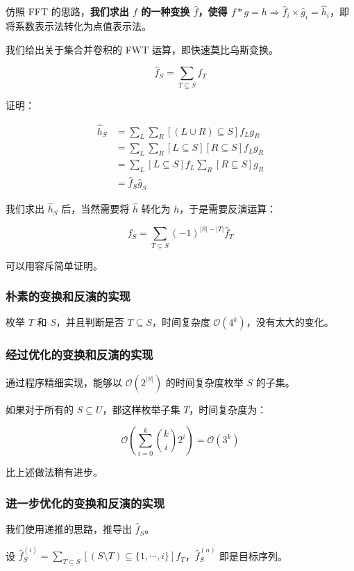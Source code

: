 \documentclass{article}
\begin{document}
仿照 FFT 的思路，\textbf{我们求出 $f$ 的一种变换 $\hat f$，使得 $f * g = h \Rightarrow \hat f_i \times \hat g_i = \hat h_i$}，即将系数表示法转化为点值表示法。

我们给出关于集合并卷积的 FWT 运算，即快速莫比乌斯变换。

$$\hat f_S=\sum_{T \subseteq S} f_T$$

证明：

$$
\begin{aligned}
	\hat h_S &=\sum_{L} \sum_{R} [(L \cup R) \subseteq S] f_L g_R \\
		 &= \sum_{L} \sum_{R} [L \subseteq S][R \subseteq S] f_L g_R \\
		 &= \sum_{L} [L \subseteq S] f_L \sum_{R} [R \subseteq S] g_R \\
		 &= \hat f_S \hat g_S
\end{aligned}
$$

我们求出 $\hat h_S$ 后，当然需要将 $\hat h$ 转化为 $h$，于是需要反演运算：

$$f_S=\sum_{T \subseteq S} (-1)^{|S|-|T|}\hat f_T$$

可以用容斥简单证明。

\subsubsection*{朴素的变换和反演的实现}

枚举 $T$ 和 $S$，并且判断是否 $T \subseteq S$，时间复杂度 $\mathcal O(4^k)$，没有太大的变化。

\subsubsection*{经过优化的变换和反演的实现}

通过程序精细实现，能够以 $\mathcal O(2^{|S|})$ 的时间复杂度枚举 $S$ 的子集。

如果对于所有的 $S \subseteq U$，都这样枚举子集 $T$，时间复杂度为：

$$\mathcal O(\sum_{i=0}^k \binom{k}{i}2^i)= \mathcal O(3^k)$$

比上述做法稍有进步。

\subsubsection*{进一步优化的变换和反演的实现}

我们使用递推的思路，推导出 $\hat f_S$。

设 $\hat f_S^{(i)}=\sum_{T\subseteq S}[(S\setminus T)\subseteq\{1,\cdots,i\}]f_T$，$\hat f_S^{(n)}$ 即是目标序列。
\end{document}
